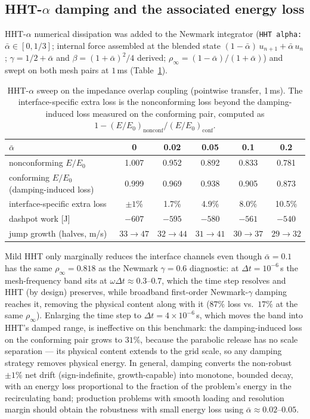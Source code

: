 \documentclass[11pt]{article}
\newcommand{\code}[1]{\texttt{#1}}
\begin{document}
\subsection{HHT-$\alpha$ damping and the associated energy loss}
\label{sec:hht}

HHT-$\alpha$ numerical dissipation was added to the Newmark integrator
(\code{HHT alpha:} $\bar\alpha \in [0, 1/3]$; internal force assembled at
the blended state $(1-\bar\alpha)\,u_{n+1} + \bar\alpha\,u_n$;
$\gamma = 1/2 + \bar\alpha$ and $\beta = (1+\bar\alpha)^2/4$ derived;
$\rho_\infty = (1-\bar\alpha)/(1+\bar\alpha)$) and swept on both mesh pairs
at $1$\,ms (Table~\ref{tab:hht}).

\begin{table}[htbp]
\centering
\small
\caption{HHT-$\alpha$ sweep on the impedance overlap coupling (pointwise
transfer, 1\,ms). The interface-specific extra loss is the nonconforming
loss beyond the damping-induced loss measured on the conforming pair, computed as
$1 - (E/E_0)_{\mathrm{nonconf}}/(E/E_0)_{\mathrm{conf}}$.}
\label{tab:hht}
\begin{tabular}{lccccc}
\toprule
$\bar\alpha$ & 0 & 0.02 & 0.05 & 0.1 & 0.2 \\
\midrule
nonconforming $E/E_0$ & 1.007 & 0.952 & 0.892 & 0.833 & 0.781 \\
conforming $E/E_0$ (damping-induced loss) & 0.999 & 0.969 & 0.938 & 0.905 & 0.873 \\
interface-specific extra loss & $\pm 1$\% & 1.7\% & 4.9\% & 8.0\% & 10.5\% \\
dashpot work [J] & $-607$ & $-595$ & $-580$ & $-561$ & $-540$ \\
jump growth (halves, m/s) & $33\to47$ & $32\to44$ & $31\to41$ & $30\to37$ & $29\to32$ \\
\bottomrule
\end{tabular}
\end{table}

Mild HHT only marginally reduces the interface channels even though
$\bar\alpha = 0.1$ has the same $\rho_\infty = 0.818$ as the Newmark
$\gamma = 0.6$ diagnostic: at $\Delta t = 10^{-6}$\,s the mesh-frequency
band sits at $\omega\Delta t \approx 0.3$--$0.7$, which the time step
resolves and HHT (by design) preserves, while broadband first-order
Newmark-$\gamma$ damping reaches it, removing the physical content along
with it ($87\%$ loss vs.\ $17\%$ at the same $\rho_\infty$). Enlarging the time step to
$\Delta t = 4\times 10^{-6}$\,s, which moves the band into HHT's damped
range, is ineffective on this benchmark: the damping-induced loss on the
conforming pair grows to $31\%$, because the parabolic release has no scale separation --- its
physical content extends to the grid scale, so any damping strategy removes
physical energy. In general, damping converts the non-robust $\pm 1\%$ net drift
(sign-indefinite, growth-capable) into monotone, bounded decay, with an
energy loss proportional to the fraction of the problem's energy in the
recirculating band; production problems with smooth loading and resolution margin should
obtain the robustness with small energy loss using
$\bar\alpha \approx 0.02$--$0.05$.
\end{document}
